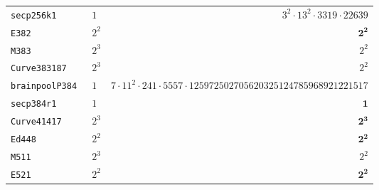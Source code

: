 \documentclass[11pt,fleqn]{article}
\begin{document}
\begin{tabularx}{\textwidth}{llR}
\texttt{\footnotesize secp256k1     }& $\scriptstyle 1  $    & $\scriptstyle 3^2 \cdot 13^2 \cdot 3319 \cdot 22639                                            $\\
\texttt{\footnotesize E382          }& $\scriptstyle 2^2$    & $\scriptstyle \mathbf{2^2}                                                                  $\\
\texttt{\footnotesize M383          }& $\scriptstyle 2^3$    & $\scriptstyle 2^2                                                                  $\\
\texttt{\footnotesize Curve383187   }& $\scriptstyle 2^3$    & $\scriptstyle 2^2                                                                  $\\
\texttt{\footnotesize brainpoolP384 }& $\scriptstyle 1  $    & $\scriptstyle 7 \cdot 11^2 \cdot 241 \cdot 5557 \cdot 125972502705620325124785968921221517         $\\
\texttt{\footnotesize secp384r1     }& $\scriptstyle 1  $    & $\scriptstyle \mathbf{1}                                                                    $\\
\texttt{\footnotesize Curve41417    }& $\scriptstyle 2^3$    & $\scriptstyle \mathbf{2^3}                                                                  $\\
\texttt{\footnotesize Ed448         }& $\scriptstyle 2^2$    & $\scriptstyle \mathbf{2^2}                                                                  $\\
\texttt{\footnotesize M511          }& $\scriptstyle 2^3$    & $\scriptstyle 2^2                                                                  $\\
\texttt{\footnotesize E521          }& $\scriptstyle 2^2$    & $\scriptstyle \mathbf{2^2}$ \\
\hline
\end{tabularx}


\printbibliography
\end{document}
